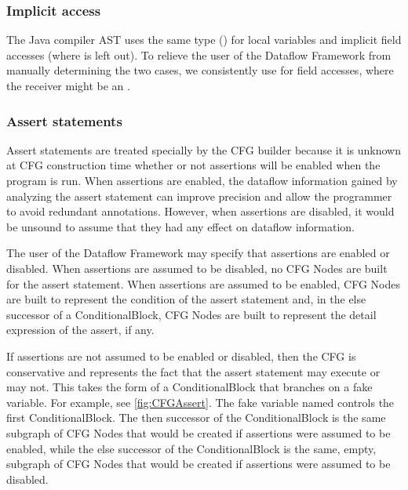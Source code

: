 \subsubsection{Implicit  access}

The Java compiler AST uses the same type () for
local variables and implicit field accesses (where  is
left out).  To relieve the user of the Dataflow Framework from
manually determining the two cases, we consistently use
 for field accesses, where the receiver might be
an .


\subsubsection{Assert statements}
\label{sec:assert-stmts}

Assert statements are treated specially by the CFG builder because it
is unknown at CFG construction time whether or not assertions will be
enabled when the program is run.  When assertions are enabled, the
dataflow information gained by analyzing the assert statement can
improve precision and allow the programmer to avoid redundant
annotations.  However, when assertions are disabled, it would be
unsound to assume that they had any effect on dataflow information.

The user of the Dataflow Framework may specify that
assertions are enabled or disabled.  When assertions are assumed to be
disabled, no CFG Nodes are built for the assert statement.
When assertions are assumed to be enabled, CFG Nodes are built to
represent the condition of the assert statement and, in the else
successor of a ConditionalBlock, CFG Nodes are built to represent the
detail expression of the assert, if any.

If assertions are not assumed to be enabled or disabled, then
the CFG is conservative and represents the fact that the
assert statement may execute or may not.  This takes the form of a
ConditionalBlock that branches on a fake variable.  For example, see
\autoref{fig:CFGAssert}.  The fake variable named
 controls the first ConditionalBlock.
The then successor of the ConditionalBlock is the same subgraph of CFG
Nodes that would be created if assertions were assumed to be enabled,
while the else successor of the ConditionalBlock is the same, empty,
subgraph of CFG Nodes that would be created if assertions were assumed
to be disabled.



